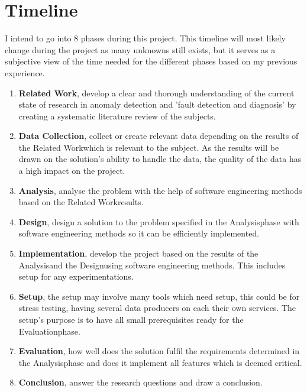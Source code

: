 \documentclass[a4paper,8pt]{article}
\newcommand{\Phases}{8 }
\newcommand{\phaseq}{Related Work}
\newcommand{\phasew}{Data Collection}
\newcommand{\phasee}{Analysis}
\newcommand{\phaser}{Design}
\newcommand{\phaset}{Implementation}
\newcommand{\phaseSetup}{Setup}
\newcommand{\phasey}{Evaluation}
\newcommand{\phaseu}{Conclusion}
\begin{document}
	\section{Timeline}
	I intend to go into \Phases phases during this project. This timeline will most likely change during the project as many unknowns still exists, but it serves as a subjective view of the time needed for the different phases based on my previous experience.
		\begin{enumerate}
			\item \textbf{\phaseq}, develop a clear and thorough understanding of the current state of research in anomaly detection and 'fault detection and diagnosis' by creating a systematic literature review of the subjects.
			\item \textbf{\phasew}, collect or create relevant data depending on the results of the \phaseq \space which is relevant to the subject. As the results will be drawn on the solution's ability to handle the data, the quality of the data has a high impact on the project.
			\item \textbf{\phasee}, analyse the problem with the help of software engineering methods based on the \phaseq \space results.
			\item \textbf{\phaser}, design a solution to the problem specified in the \phasee \space phase with software engineering methods so it can be efficiently implemented.
			\item \textbf{\phaset}, develop the project based on the results of the \phasee \space and the \phaser \space using software engineering methods. This includes setup for any experimentations.
			\item \textbf{\phaseSetup}, the setup may involve many tools which need setup, this could be for stress testing, having several data producers on each their own services. The setup's purpose is to have all small prerequisites ready for the \phasey \space phase.
			\item \textbf{\phasey}, how well does the solution fulfil the requirements determined in the \phasee \space phase and does it implement all features which is deemed critical.
			\item \textbf{\phaseu}, answer the research questions and draw a conclusion.
		\end{enumerate}
	
\end{document}
